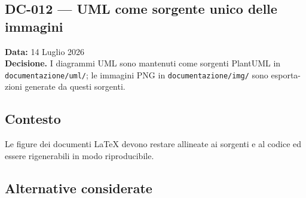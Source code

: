 \documentclass[a4paper,12pt]{article}
\begin{document}
\begin{decisionbox}
\section*{DC-012 --- UML come sorgente unico delle immagini}
\textbf{Data:} 14 Luglio 2026\\
\textbf{Decisione.} I diagrammi UML sono mantenuti come sorgenti PlantUML in \texttt{documentazione/uml/}; le immagini PNG in \texttt{documentazione/img/} sono esporta- \\ zioni generate da questi sorgenti.
\end{decisionbox}

\subsection*{Contesto}
Le figure dei documenti LaTeX devono restare allineate ai sorgenti e al codice ed essere rigenerabili in modo riproducibile.


\subsection*{Alternative considerate}
\end{document}
